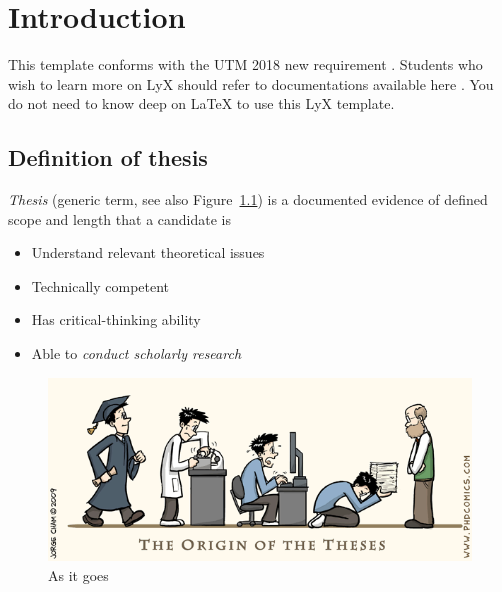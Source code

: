 \documentclass[twoside]{utmthesis}
\begin{document}
\listofabbre
{}


\listofsymbols
{}


\listofappendices


\mainmatter


\chapter{Introduction}

This template conforms with the \ac{UTM} 2018 new requirement \cite{utm:thesis:manual}.
Students who wish to learn more on LyX should refer to documentations
available here \cite{lyx:download}. You do not need to know deep
on LaTeX \cite{latex:wikibook} to use this LyX template.

\section{Definition of thesis }

\noindent \emph{Thesis} (generic term, see also Figure~\ref{fig1})
is a documented evidence of defined scope and length that a candidate
is 
\begin{itemize}
\item Understand relevant theoretical issues
\item Technically competent
\item Has critical-thinking ability
\item Able to \emph{conduct scholarly research}
\end{itemize}
\begin{figure}[h]
\begin{centering}
\includegraphics[width=1\textwidth]{./figs/pasted13}
\par\end{centering}
\caption{As it goes}
\label{fig1}

\end{figure}
\end{document}

